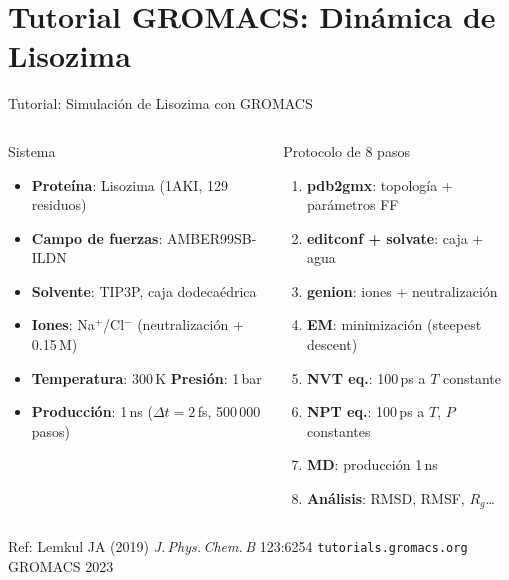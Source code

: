 \documentclass[aspectratio=169, 10pt]{beamer}
\begin{document}
\section{Tutorial GROMACS: Dinámica de Lisozima}

\begin{frame}{Tutorial: Simulación de Lisozima con GROMACS}
\begin{columns}[T]
\begin{block}{Sistema}
  \begin{itemize}\small
    \item \textbf{Proteína}: Lisozima (1AKI, 129 residuos)
    \item \textbf{Campo de fuerzas}: AMBER99SB-ILDN
    \item \textbf{Solvente}: TIP3P, caja dodecaédrica
    \item \textbf{Iones}: Na$^+$/Cl$^-$ (neutralización + 0.15\,M)
    \item \textbf{Temperatura}: 300\,K \quad \textbf{Presión}: 1\,bar
    \item \textbf{Producción}: 1\,ns ($\Delta t = 2$\,fs, 500\,000 pasos)
  \end{itemize}
\end{block}
\begin{block}{Protocolo de 8 pasos}
  \begin{enumerate}\small
    \item[\textbf{1.}] \textbf{pdb2gmx}: topología + parámetros FF
    \item[\textbf{2.}] \textbf{editconf + solvate}: caja + agua
    \item[\textbf{3.}] \textbf{genion}: iones + neutralización
    \item[\textbf{4.}] \textbf{EM}: minimización (steepest descent)
    \item[\textbf{5.}] \textbf{NVT eq.}: 100\,ps a $T$ constante
    \item[\textbf{6.}] \textbf{NPT eq.}: 100\,ps a $T$, $P$ constantes
    \item[\textbf{7.}] \textbf{MD}: producción 1\,ns
    \item[\textbf{8.}] \textbf{Análisis}: RMSD, RMSF, $R_g$\ldots
  \end{enumerate}
\end{block}
\end{columns}
\vspace{0.3em}
\begin{tcolorbox}[comparisonbox]
  \centering\small
  Ref: Lemkul JA (2019) \textit{J.\,Phys.\,Chem.\,B} 123:6254 \quad
  \texttt{tutorials.gromacs.org} \quad GROMACS 2023
\end{tcolorbox}
\end{frame}
\end{document}
